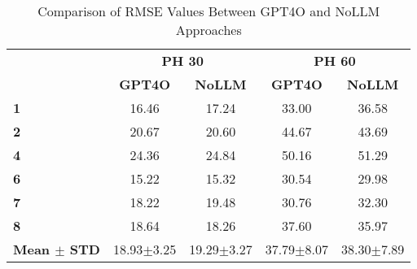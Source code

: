\begin{table}
\caption{Comparison of RMSE Values Between GPT4O and NoLLM Approaches}
\label{tab:rmse_comparison}
\centering
\renewcommand{\arraystretch}{1.3}
\begin{tabular}{|l|cc|cc|}
\hline
\rowcolor{gray!20} \multirow{1}{*}{\textbf{Patient}} & \multicolumn{2}{c|}{\textbf{PH 30}} & \multicolumn{2}{c|}{\textbf{PH 60}} \\[+0.5ex]
\rowcolor{gray!20} & \textbf{GPT4O} & \textbf{NoLLM} & \textbf{GPT4O} & \textbf{NoLLM} \\[-1.5ex]
\hline
\rowcolor{gray!10}
\textbf{1} & 16.46 & 17.24 & 33.00 & 36.58 \\
\hline
\textbf{2} & 20.67 & 20.60 & 44.67 & 43.69 \\
\hline
\rowcolor{gray!10}
\textbf{4} & 24.36 & 24.84 & 50.16 & 51.29 \\
\hline
\textbf{6} & 15.22 & 15.32 & 30.54 & 29.98 \\
\hline
\rowcolor{gray!10}
\textbf{7} & 18.22 & 19.48 & 30.76 & 32.30 \\
\hline
\textbf{8} & 18.64 & 18.26 & 37.60 & 35.97 \\
\hline
\rowcolor{gray!20}
\textbf{Mean $\pm$ STD} & 18.93$\pm$3.25 & 19.29$\pm$3.27 & 37.79$\pm$8.07 & 38.30$\pm$7.89 \\
\hline
\end{tabular}
\end{table}